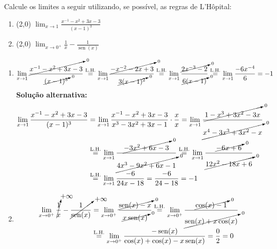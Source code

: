 \documentclass[12pt,a4paper]{article}
\newcommand*\sen{\operatorname{sen}}
\begin{document}
\begin{ExerciseList}
\Exercise[title={4,0}]
Calcule os limites a seguir utilizando, se possível, as regras de L'Hôpital:
\begin{multicols}{2}
\begin{enumerate}
\item (2,0) $\displaystyle\lim_{x \to 1} \frac{x^{-1} - x^2 + 3x - 3}{(x - 1)^3}$
\item (2,0) $\displaystyle\lim_{x \to 0^{+}} \frac{1}{x} - \frac{1}{\sen(x)}$
\end{enumerate}
\end{multicols}
\Answer
\begin{enumerate}
\item
\[
\lim_{x \to 1} \frac{ \cancelto{0}{x^{-1} - x^2 + 3x - 3} }{ \cancelto{0}{(x - 1)^3}}
\stackrel{\text{L.H.}}{=}\lim_{x \to 1} \frac{ \cancelto{0}{-x^{-2} - 2x + 3} }{ \cancelto{0}{3(x - 1)^2} }
\stackrel{\text{L.H.}}{=}\lim_{x \to 1} \frac{\cancelto{0}{2x^{-3} - 2} }{ \cancelto{0}{6(x - 1) }}
\stackrel{\text{L.H.}}{=}\lim_{x \to 1} \frac{-6x^{-4}}{6}
=-1
\]
\textbf{Solução alternativa:}
\begin{align*}
\lim_{x \to 1} \frac{x^{-1} - x^2 + 3x - 3}{(x - 1)^3}
& = \lim_{x \to 1} \frac{x^{-1} - x^2 + 3x - 3}{x^3 - 3x^2 + 3x -1}
    \cdot \frac{x}{x}
  = \lim_{x \to 1} \frac{\cancelto{0}{1 - x^3 + 3x^2 - 3x}}{\cancelto{0}{x^4 - 3x^3 + 3x^2 -x}} \\
& \stackrel{\text{L.H.}}{=}
    \lim_{x \to 1} \frac{\cancelto{0}{-3x^2 +6x - 3}}{\cancelto{0}{4x^3 - 9x^2 + 6x - 1}}
  \stackrel{\text{L.H.}}{=}
    \lim_{x \to 1} \frac{\cancelto{0}{-6x +6}}{\cancelto{0}{12x^2 - 18x + 6}} \\
& \stackrel{\text{L.H.}}{=}
    \lim_{x \to 1} \frac{-6}{24x - 18}
 = \frac{-6}{24 - 18} = -1
\end{align*}

\item
\begin{align*}
\lim_{x \to 0^{+}} \cancelto{+\infty}{\frac{1}{x}} - \cancelto{+\infty}{\frac{1}{\sen(x)}}
& = \lim_{x \to 0^{+}} \frac{\cancelto{0}{\sen(x) - x}}{\cancelto{0}{x\sen(x)}}
\stackrel{\text{L.H.}}{=} \lim_{x \to 0^{+}} \frac{\cancelto{0}{\cos(x) - 1}}{\cancelto{0}{\sen(x)+x\cos(x)}} \\
& \stackrel{\text{L.H.}}{=} \lim_{x \to 0^{+}} \frac{-\sen(x)}{\cos(x)+\cos(x)-x\sen(x)}
= \frac{0}{2} = 0
\end{align*}
\end{enumerate}



\end{ExerciseList}
\end{document}
